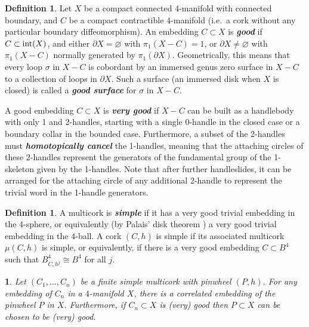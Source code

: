 \documentclass[11pt]{amsart}
\newcommand{\thistheoremname}{}
\newtheorem{genericthm}[theorem]{\thistheoremname}
\newenvironment{namedtheorem}[1]
  {\renewcommand{\thistheoremname}{#1}%
   \begin{genericthm}}
  {\end{genericthm}}
\theoremstyle{definition}
\newtheorem{definition}[theorem]{Definition}
\newcommand{\bit}[1]{\textbf{\textit{#1}}} %
\newcommand{\del}{\partial}
\newcommand{\interior}{\textup{int}}
\begin{document}
\begin{definition} \label{def:good}  Let $X$ be a compact connected 4-manifold with connected boundary, and $C$ be a compact contractible $4$-manifold (i.e.\ a cork without any particular boundary diffeomorphism).   An embedding $C\subset X$ is \bit{good} if $C\subset\interior(X)$, and either $\del X = \varnothing$ with $\pi_1(X-C)=1$, or $\del X\ne\varnothing$ with $\pi_1(X-C)$ normally generated by $\pi_1(\del X)$.  Geometrically, this means that every loop $\sigma$ in $X-C$ is cobordant by an immersed genus zero surface in $X-C$ to a collection of loops in $\del X$.  Such a surface (an immersed disk when $X$ is closed) is called a \bit{good surface} for $\sigma$ in $X-C$.  

A good embedding $C\subset X$ is \bit{very good} if $X-C$ can be built as a handlebody with only 1 and 2-handles, starting with a single 0-handle in the closed case or a boundary collar in the bounded case. Furthermore, a subset of the 2-handles must \bit{homotopically cancel} the 1-handles, meaning that the attaching circles of these 2-handles represent the generators of the fundamental group of the 1-skeleton given by the 1-handles. Note that after further handleslides, it can be arranged for the attaching circle of any additional 2-handle to represent the trivial word in the 1-handle generators.   
\end{definition}

  

\begin{definition}\label{def:simple}
A multicork is \bit{simple} if it has a very good trivial embedding in the $4$-sphere, or equivalently (by Palais' disk theorem \cite{palais}) a very good trivial embedding in the $4$-ball.  A cork $(C,h)$ is simple if its associated multicork $\mu(C,h)$ is simple, or equivalently, if there is a very good embedding $C\subset B^4$ such that $B^4_{C,h^j} \cong B^4$ for all $j$.
\end{definition} 


\begin{namedtheorem}{Pinwheel Lemma}\label{pinwheel}
Let $(C_1,\dots, C_{n})$ be a finite simple multicork with pinwheel $(P,h)$.  For any embedding of $C_n$ in a $4$-manifold $X$, there is a correlated embedding of the pinwheel $P$ in $X$.  Furthermore, if $C_n\subset X$ is (very) good then $P\subset X$ can be chosen to be (very) good. 
\end{namedtheorem}   
\end{document}
